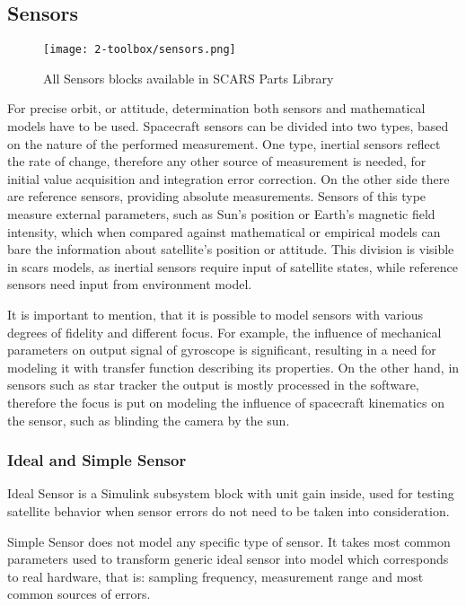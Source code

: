 \subsection{Sensors}\label{sec:sensors}
    \begin{figure}[H]
        \centering
        \texttt{[image: 2-toolbox/sensors.png]}
        \caption{All Sensors blocks available in SCARS Parts Library}
        \label{fig:sensors}
    \end{figure}

    For precise orbit, or attitude, determination both sensors and mathematical models have to be used. Spacecraft sensors can be divided into two types, based on the nature of the performed measurement. One type, inertial sensors reflect the rate of change, therefore any other source of measurement is needed, for initial value acquisition and integration error correction. On the other side there are reference sensors, providing absolute measurements. Sensors of this type measure external parameters, such as Sun's position or Earth's magnetic field intensity, which when compared against mathematical or empirical models can bare the information about satellite's position or attitude. This division is visible in \ac{scars} models, as inertial sensors require input of satellite states, while reference sensors need input from environment model.

    It is important to mention, that it is possible to model sensors with various degrees of fidelity and different focus. For example, the influence of mechanical parameters on output signal of gyroscope is significant, resulting in a need for modeling it with transfer function describing its properties. On the other hand, in sensors such as star tracker the output is mostly processed in the software, therefore the focus is put on modeling the influence of spacecraft kinematics on the sensor, such as blinding the camera by the sun.

    \subsubsection{Ideal and Simple Sensor}
        Ideal Sensor is a Simulink subsystem block with unit gain inside, used for testing satellite behavior when sensor errors do not need to be taken into consideration.

        Simple Sensor does not model any specific type of sensor. It takes most common parameters used to transform generic ideal sensor into model which corresponds to real hardware, that is: sampling frequency, measurement range and most common sources of errors.

